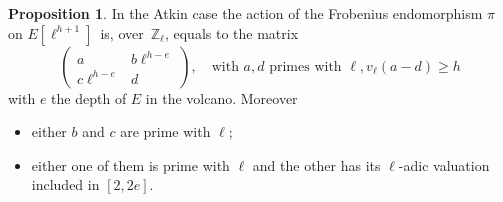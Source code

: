 \documentclass[10pt,a4paper]{beamer}
\theoremstyle{plain}
\theoremstyle{definition}
\theoremstyle{definition}
\theoremstyle{definition}
\newtheorem{prop}[thm]{Proposition}
\theoremstyle{definition}
\theoremstyle{remark}
\theoremstyle{remark}
\begin{document}


\begin{frame}
\begin{prop}
In the Atkin case the action of the Frobenius endomorphism $\pi$ on 
$E[\ell^{h+1}]$~is, over~$\mathbb{Z}_{\ell}$, equals to the matrix 
\[\left ( \begin{matrix}a & b\ell^{h-e} \\ c\ell^{h-e} & d
\end{matrix}\right ), \quad \text{with }a,d \text{ primes with }\ell, v_{\ell}(a-d)\geqslant h \]  %
with $e$ the depth of $E$ in the volcano. Moreover 
\begin{itemize}
\item either $b$ and $c$ are prime with $\ell$;
\item either one of them is prime with $\ell$ and the other has its $\ell$-adic valuation included in $ [2,2e]$.

\end{itemize}
\end{prop}


\end{frame}
\end{document}
